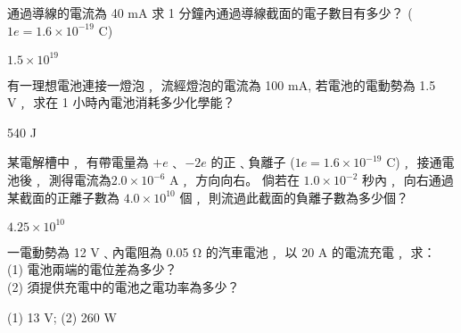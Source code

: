 \documentclass[12pt]{examdesign}
\begin{document}
\begin{shortanswer}[
suppressprefix,examcolumns=2,keycolumns=2]

\begin{question}
通過導線的電流為 40 \si{\mA}
求 1 分鐘內通過導線截面的電子數目有多少？
($ 1 e = 1.6 \times 10^{-19} $ C)
\begin{answer}
$ 1.5 \times 10^{19}$
\end{answer}
\end{question}

\begin{question}
有一理想電池連接一燈泡﹐
流經燈泡的電流為 100 \si{\mA},
若電池的電動勢為 1.5 \si{\volt}﹐
求在 1 小時內電池消耗多少化學能？
\begin{answer}
540 \si{\joule}
\end{answer}
\end{question}

\begin{question}
某電解槽中﹐
有帶電量為 $+e$﹑
$-2e$ 的正﹑負離子 ($1e = 1.6 \times 10^{-19}$ C)﹐
接通電池後﹐
測得電流為$ 2.0 \times 10^{-6} $ \si{\ampere}﹐
方向向右。
倘若在 $1.0 \times 10^{-2}$ 秒內﹐
向右通過某截面的正離子數為 $4.0 \times 10^{10}$ 個﹐
則流過此截面的負離子數為多少個？
\begin{answer}
$ 4.25 \times 10^{10}$
\end{answer}
\end{question}

\begin{question}
一電動勢為 12 \si{\volt}﹑內電阻為 0.05 \si{\ohm} 的汽車電池﹐
以 20 \si{\ampere} 的電流充電﹐
求：\\
(1) 電池兩端的電位差為多少？\\
(2) 須提供充電中的電池之電功率為多少？
\begin{center}
\end{center}
\begin{answer}
(1) 13 \si{\volt}; (2) 260 \si{\watt}
\end{answer}
\end{question}


\end{shortanswer}
\end{document}
